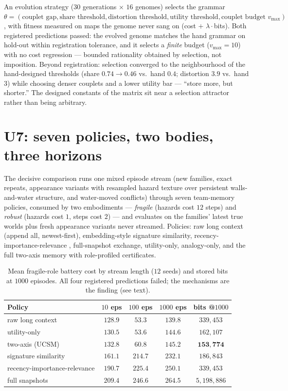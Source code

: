\documentclass{article}
\begin{document}
An evolution strategy ($30$ generations $\times$ $16$ genomes)
selects the grammar $\theta = (\text{couplet gap},
\text{share threshold}, \text{distortion threshold},
\text{utility threshold}, \text{couplet budget } v_{\max})$, with
fitness measured on maps the genome never sang on (cost $+$
$\lambda\cdot$bits). Both registered predictions passed: the evolved
genome matches the hand grammar on hold-out within registration
tolerance, and it selects a \emph{finite} budget ($v_{\max} = 10$)
with no cost regression --- bounded rationality obtained by
selection, not imposition. Beyond registration: selection converged
to the neighbourhood of the hand-designed thresholds (share
$0.74 \to 0.46$ vs.\ hand $0.4$; distortion $3.9$ vs.\ hand $3$)
while choosing denser couplets and a lower utility bar --- ``store
more, but shorter.'' The designed constants of the matrix sit near a
selection attractor rather than being arbitrary.

\section{U7: seven policies, two bodies, three horizons}
\label{sec:u7}

The decisive comparison runs one mixed episode stream (new families,
exact repeats, appearance variants with resampled hazard texture over
persistent walls-and-water structure, and water-moved conflicts)
through seven team-memory policies, consumed by two embodiments ---
\emph{fragile} (hazards cost $12$ steps) and \emph{robust} (hazards
cost $1$, steps cost $2$) --- and evaluates on the families' latest
true worlds plus fresh appearance variants never streamed. Policies:
raw long context (append all, newest-first), embedding-style
signature similarity, recency-importance-relevance
\citep{genagents2023}, full-snapshot exchange, utility-only,
analogy-only, and the full two-axis memory with role-profiled
certificates.

\begin{table}[h]
\centering
\caption{Mean fragile-role battery cost by stream length ($12$ seeds)
and stored bits at $1000$ episodes. All four registered predictions
failed; the mechanisms are the finding (see text).}
\label{tab:u7}
\small
\begin{tabular}{lcccc}
\toprule
Policy & $10$ eps & $100$ eps & $1000$ eps & bits @$1000$ \\
\midrule
raw long context & $128.9$ & $\mathbf{53.3}$ & $\mathbf{139.8}$ & $339{,}453$ \\
utility-only & $130.5$ & $53.6$ & $144.6$ & $162{,}107$ \\
two-axis (UCSM) & $132.8$ & $60.8$ & $145.2$ & $\mathbf{153{,}774}$ \\
signature similarity & $161.1$ & $214.7$ & $232.1$ & $186{,}843$ \\
recency-importance-relevance & $190.7$ & $225.4$ & $250.1$ & $339{,}453$ \\
full snapshots & $209.4$ & $246.6$ & $264.5$ & $5{,}198{,}886$ \\
\bottomrule
\end{tabular}
\end{table}
\end{document}

